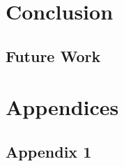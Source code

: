 \documentclass[11pt ,twoside]{article}
\numberwithin{equation}{section}
\begin{document}
\section{Conclusion} 
\label{seq:Conclusion}

\subsection{Future Work} 
\label{seq:Future Work}





\clearpage





\clearpage

\renewcommand{\refname}{Additional Reading}


\clearpage

\setcounter{subsection}{0}
\section*{Appendices}%

\renewcommand\thesubsection{A\kern 0.16em\arabic{subsection}} %


\subsection{Appendix 1}
\label{app:placeholder}
\inputminted[linenos, baselinestretch=0.9, fontsize=\footnotesize]{c}{code/prova.C}
\end{document}
